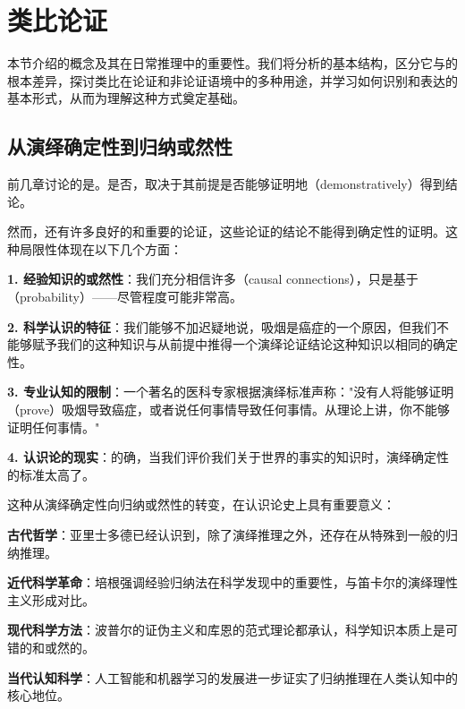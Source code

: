 \section{类比论证}

\begin{logicbox}[title=引言]
本节介绍的概念及其在日常推理中的重要性。我们将分析的基本结构，区分它与的根本差异，探讨类比在论证和非论证语境中的多种用途，并学习如何识别和表达的基本形式，从而为理解这种方式奠定基础。
\end{logicbox}

\subsection{从演绎确定性到归纳或然性}

前几章讨论的是。是否，取决于其前提是否能够证明地（demonstratively）得到结论。

\begin{theorembox}[title=演绎确定性的局限性]
然而，还有许多良好的和重要的论证，这些论证的结论不能得到确定性的证明。这种局限性体现在以下几个方面：

\textbf{1. 经验知识的或然性}：我们充分相信许多（causal connections），只是基于（probability）——尽管程度可能非常高。

\textbf{2. 科学认识的特征}：我们能够不加迟疑地说，吸烟是癌症的一个原因，但我们不能够赋予我们的这种知识与从前提中推得一个演绎论证结论这种知识以相同的确定性。

\textbf{3. 专业认知的限制}：一个著名的医科专家根据演绎标准声称："没有人将能够证明（prove）吸烟导致癌症，或者说任何事情导致任何事情。从理论上讲，你不能够证明任何事情。"\cite{surgeon1964}

\textbf{4. 认识论的现实}：的确，当我们评价我们关于世界的事实的知识时，演绎确定性的标准太高了。
\end{theorembox}

\begin{examplebox}[title=归纳推理的历史必然性]
这种从演绎确定性向归纳或然性的转变，在认识论史上具有重要意义：

\textbf{古代哲学}：亚里士多德已经认识到，除了演绎推理之外，还存在从特殊到一般的归纳推理。

\textbf{近代科学革命}：培根强调经验归纳法在科学发现中的重要性，与笛卡尔的演绎理性主义形成对比。

\textbf{现代科学方法}：波普尔的证伪主义和库恩的范式理论都承认，科学知识本质上是可错的和或然的。

\textbf{当代认知科学}：人工智能和机器学习的发展进一步证实了归纳推理在人类认知中的核心地位。
\end{examplebox}

